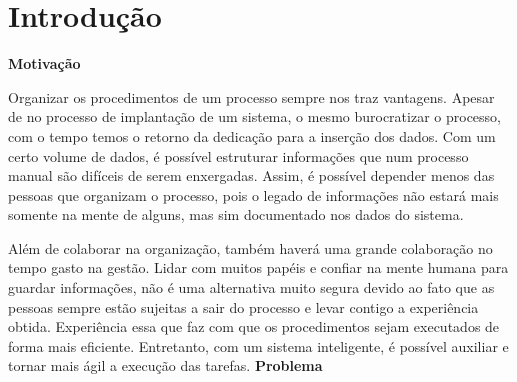 \chapter{Introdução}
\textbf{Motivação}

Organizar os procedimentos de um processo sempre nos traz vantagens. Apesar de no processo de implantação de um sistema, o mesmo burocratizar o processo, com o tempo temos o retorno da dedicação para a inserção dos dados. Com um certo volume de dados, é possível estruturar informações que num processo manual são difíceis de serem enxergadas. Assim, é possível depender menos das pessoas que organizam o processo, pois o legado de informações não estará mais somente na mente de alguns, mas sim documentado nos dados do sistema.

Além de colaborar na organização, também haverá uma grande colaboração no tempo gasto na gestão. Lidar com muitos papéis e confiar na mente humana para guardar informações, não é uma alternativa muito segura devido ao fato que as pessoas sempre estão sujeitas a sair do processo e levar contigo a experiência obtida. Experiência essa que faz com que os procedimentos sejam executados de forma mais eficiente. Entretanto, com um sistema inteligente, é possível auxiliar e tornar mais ágil a execução das tarefas.
\textbf{Problema}

